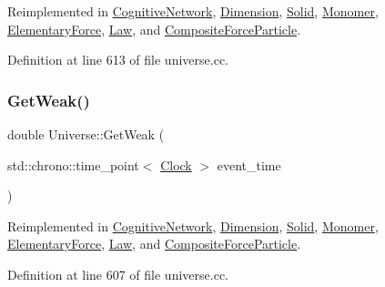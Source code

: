 Reimplemented in \mbox{\hyperlink{class_cognitive_network_acfa5de663b3e686c4d9ea1a3bb483b11}{Cognitive\+Network}}, \mbox{\hyperlink{class_dimension_aeee6025f17d9cd1bf7f324d715a30691}{Dimension}}, \mbox{\hyperlink{class_solid_a9cfde1c3a4b7c6d2a5a3719d74e27237}{Solid}}, \mbox{\hyperlink{class_monomer_a3b00168520f592098356f7cd3e663ad3}{Monomer}}, \mbox{\hyperlink{class_elementary_force_a3478c8ad35bce240055da7d4a03e555e}{Elementary\+Force}}, \mbox{\hyperlink{class_law_a70fb2a7710776c4e2315a1e29fe35eb6}{Law}}, and \mbox{\hyperlink{class_composite_force_particle_a24214566eb5b44340d5563b6583052e8}{Composite\+Force\+Particle}}.



Definition at line 613 of file universe.\+cc.

\mbox{\label{class_universe_a4476b7e0a3fc1764909f556257fd9ec7}} 
\subsubsection{\texorpdfstring{Get\+Weak()}{GetWeak()}}
{\footnotesize\ttfamily double Universe\+::\+Get\+Weak (\begin{DoxyParamCaption}\item[{std\+::chrono\+::time\+\_\+point$<$ \mbox{\hyperlink{universe_8h_a0ef8d951d1ca5ab3cfaf7ab4c7a6fd80}{Clock}} $>$}]{event\+\_\+time }\end{DoxyParamCaption})\hspace{0.3cm}{\ttfamily [virtual]}}



Reimplemented in \mbox{\hyperlink{class_cognitive_network_a761db75ac8eab7b4625e5a398891bd12}{Cognitive\+Network}}, \mbox{\hyperlink{class_dimension_a656ce92d07ea600cc0ec53865ad515e2}{Dimension}}, \mbox{\hyperlink{class_solid_ac8a7738735a6bda4e89414a2b0c370e1}{Solid}}, \mbox{\hyperlink{class_monomer_ac2070d7e39cd0b2a00aa6023ffd51f55}{Monomer}}, \mbox{\hyperlink{class_elementary_force_a4669f2ce414e508c70ae4ce0df503ad1}{Elementary\+Force}}, \mbox{\hyperlink{class_law_a303c365b7a17997a63a74756fc72fba3}{Law}}, and \mbox{\hyperlink{class_composite_force_particle_ab5cc0893a4063cc353ea5d2404f27b0b}{Composite\+Force\+Particle}}.



Definition at line 607 of file universe.\+cc.

\mbox{\label{class_universe_a645299738e6b798a037f2a15a2e7cf4d}} 
